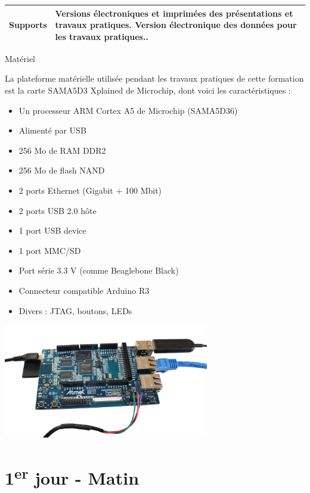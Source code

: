 \documentclass[a4paper,12pt,obeyspaces,spaces,hyphens]{article}
\begin{document}
{\begin{tabularx}{\textwidth}{|g|h|}
    {\bf Supports} & Versions électroniques et imprimées des
    présentations et travaux pratiques.
    \newline Version électronique des données pour les travaux
    pratiques..\\
    \hline

\end{tabularx}}
\normalsize

\feagendatwocolumn
{Matériel}
{
  La plateforme matérielle utilisée pendant les travaux pratiques de
  cette formation est la carte {SAMA5D3 Xplained de Microchip}, dont voici les
  caractéristiques :

  \begin{itemize}
  \item Un processeur ARM Cortex A5 de Microchip (SAMA5D36)
  \item Alimenté par USB
  \item 256 Mo de RAM DDR2
  \item 256 Mo de flash NAND
  \item 2 ports Ethernet (Gigabit + 100 Mbit)
  \item 2 ports USB 2.0 hôte
  \item 1 port USB device
  \item 1 port MMC/SD
  \item Port série 3.3 V (comme Beaglebone Black)
  \item Connecteur compatible Arduino R3
  \item Divers : JTAG, boutons, LEDs
  \end{itemize}
}
{}
{
  \begin{center}
    \includegraphics[height=5cm]{../slides/xplained-board/xplained-board.png}
  \end{center}
}

\section{1\textsuperscript{er} jour - Matin}
\end{document}

